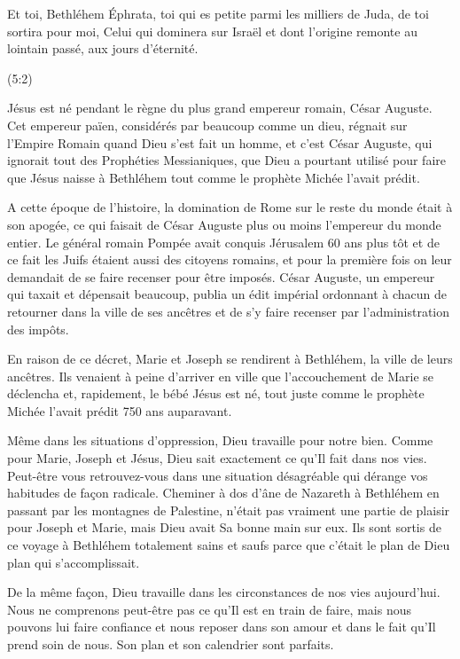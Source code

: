 
\epigraph{%
Et toi, Bethléhem Éphrata, toi qui es petite parmi les milliers de Juda, de toi sortira pour moi, Celui qui dominera sur Israël et dont l’origine remonte au lointain passé, aux jours d’éternité.}{(5:2)}

Jésus est né pendant le règne du plus grand empereur romain, César Auguste. Cet empereur païen, considérés par beaucoup comme un dieu, régnait sur l'Empire Romain quand Dieu s'est fait un homme, et c'est César Auguste, qui ignorait tout des Prophéties Messianiques, que Dieu a pourtant utilisé pour faire que Jésus naisse à Bethléhem tout comme le prophète Michée l'avait prédit.

A cette époque de l'histoire, la domination de Rome sur le reste du monde était à son apogée, ce qui faisait de César Auguste plus ou moins l'empereur du monde entier. Le général romain Pompée avait conquis Jérusalem 60 ans plus tôt et de ce fait les Juifs étaient aussi des citoyens romains, et pour la première fois on leur demandait de se faire recenser pour être imposés. César Auguste, un empereur qui taxait et dépensait beaucoup, publia un édit impérial ordonnant à chacun de retourner dans la ville de ses ancêtres et de s'y faire recenser par l'administration des impôts.

En raison de ce décret, Marie et Joseph se rendirent à Bethléhem, la ville de leurs ancêtres. Ils venaient à peine d'arriver en ville que l'accouchement de Marie se déclencha et, rapidement, le bébé Jésus est né, tout juste comme le prophète Michée l'avait prédit 750 ans auparavant.

Même dans les situations d'oppression, Dieu travaille pour notre bien. Comme pour Marie, Joseph et Jésus, Dieu sait exactement ce qu'Il fait dans nos vies. Peut-être vous retrouvez-vous dans une situation désagréable qui dérange vos habitudes de façon radicale. Cheminer à dos d'âne de Nazareth à Bethléhem en passant par les montagnes de Palestine, n'était pas vraiment une partie de plaisir pour Joseph et Marie, mais Dieu avait Sa bonne main sur eux. Ils sont sortis de ce voyage à Bethléhem totalement sains et saufs parce que c'était le plan de Dieu plan qui s'accomplissait.

De la même façon, Dieu travaille dans les circonstances de nos vies aujourd'hui. Nous ne comprenons peut-être pas ce qu'Il est en train de faire, mais nous pouvons lui faire confiance et nous reposer dans son amour et dans le fait qu'Il prend soin de nous. Son plan et son calendrier sont parfaits.


